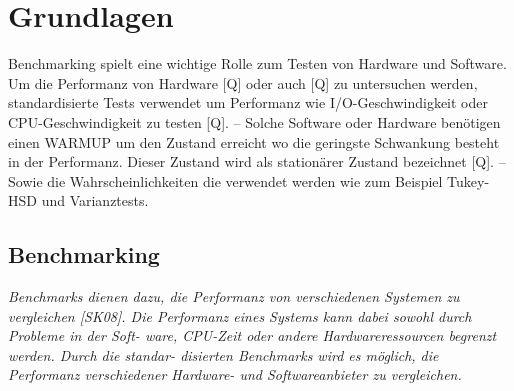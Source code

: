 \chapter{Grundlagen}
\label{cha:Grundlagen}
Benchmarking spielt eine wichtige Rolle zum Testen von Hardware und Software.
Um die Performanz von Hardware [Q] oder auch [Q] zu untersuchen werden, standardisierte Tests verwendet
um Performanz wie I/O-Geschwindigkeit oder CPU-Geschwindigkeit zu testen [Q].
-- Solche Software oder Hardware benötigen einen WARMUP um den Zustand erreicht wo die geringste Schwankung
besteht in der Performanz. Dieser Zustand wird als stationärer Zustand bezeichnet [Q]. --
Sowie die Wahrscheinlichkeiten die verwendet werden wie zum Beispiel Tukey-HSD und Varianztests.

\section{Benchmarking}
\textit{Benchmarks dienen dazu, die Performanz von verschiedenen Systemen zu vergleichen
[SK08]. Die Performanz eines Systems kann dabei sowohl durch Probleme in der Soft-
ware, CPU-Zeit oder andere Hardwareressourcen begrenzt werden. Durch die standar-
disierten Benchmarks wird es möglich, die Performanz verschiedener Hardware- und
Softwareanbieter zu vergleichen.}

